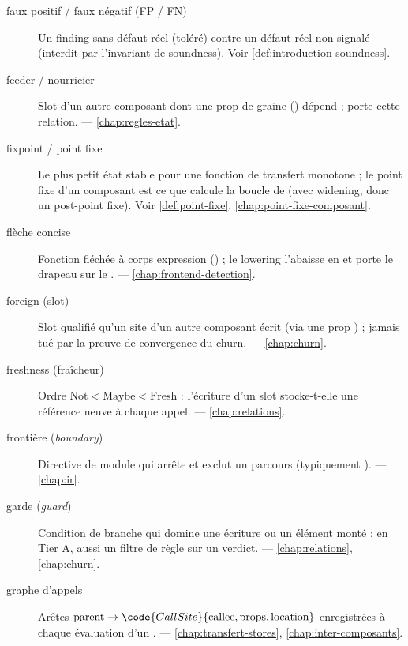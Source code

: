 \begin{description}
\item[faux positif / faux négatif (FP / FN)] Un finding sans défaut réel (toléré) contre un défaut réel non signalé (interdit par l'invariant de soundness). Voir \cref{def:introduction-soundness}.

\item[feeder / nourricier] Slot d'un autre composant dont une prop de graine () dépend ;  porte cette relation.  — \cref{chap:regles-etat}.

\item[fixpoint / point fixe] Le plus petit état stable pour une fonction de transfert monotone ; le point fixe d'un composant est ce que calcule la boucle de  (avec widening, donc un post-point fixe). Voir \cref{def:point-fixe}. \cref{chap:point-fixe-composant}.

\item[flèche concise] Fonction fléchée à corps expression () ; le lowering l'abaisse en  et porte le drapeau  sur le .  — \cref{chap:frontend-detection}.

\item[foreign (slot)] Slot qualifié qu'un site d'un autre composant écrit (via une prop ) ; jamais tué par la preuve de convergence du churn.  — \cref{chap:churn}.

\item[freshness (fraîcheur)] Ordre \(\text{Not} < \text{Maybe} < \text{Fresh}\) : l'écriture d'un slot stocke-t-elle une référence neuve à chaque appel.  — \cref{chap:relations}.

\item[frontière (\emph{boundary})] Directive de module qui arrête et exclut un parcours  (typiquement ).  — \cref{chap:ir}.

\item[garde (\emph{guard})] Condition de branche qui domine une écriture ou un élément monté ; en Tier A, aussi un filtre de règle sur un verdict.  — \cref{chap:relations}, \cref{chap:churn}.

\item[graphe d'appels] Arêtes \(\text{parent} \to \code{CallSite}\{\text{callee}, \text{props}, \text{location}\}\) enregistrées à chaque évaluation d'un .  — \cref{chap:transfert-stores}, \cref{chap:inter-composants}.


\end{description}
